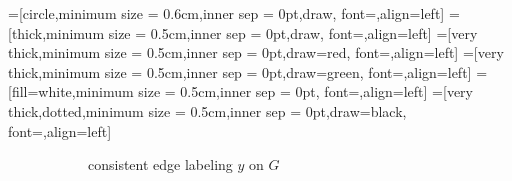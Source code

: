 
=[circle,minimum size = 0.6cm,inner sep = 0pt,draw, font=\small,align=left]
=[thick,minimum size = 0.5cm,inner sep = 0pt,draw, font=\small,align=left]
=[very thick,minimum size = 0.5cm,inner sep = 0pt,draw=red, font=\small,align=left]
=[very thick,minimum size = 0.5cm,inner sep = 0pt,draw=green, font=\small,align=left]
=[fill=white,minimum size = 0.5cm,inner sep = 0pt, font=\tiny,align=left]
=[very thick,dotted,minimum size = 0.5cm,inner sep = 0pt,draw=black, font=\small,align=left]

\begin{center}
\begin{figure}[h]
\begin{subfigure}[t]{0.4\linewidth}
\caption{ consistent edge labeling $y$ on $G$}
\label{fig:cont_a}
\end{subfigure}
\hfill
\begin{subfigure}[t]{0.4\linewidth}
\end{subfigure}
\end{figure}
\end{center}
